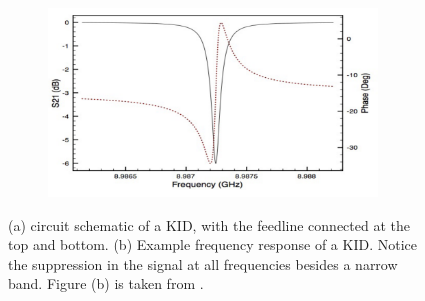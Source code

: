 \begin{figure}
	\centering
	\begin{subfigure}{0.4\textwidth}
		\caption{}
		\label{kid-circuit}
	\end{subfigure}
	\begin{subfigure}{0.4\textwidth}
		\includegraphics[width = \textwidth, height = 5cm]{images/freq-response.png}
		\caption{}
		\label{freq-response}
	\end{subfigure}
	\caption{(a) circuit schematic of a KID, with the feedline connected at the top and bottom. (b) Example
	frequency response of a KID. Notice the suppression in the signal at all frequencies besides a narrow
band. Figure (b) is taken from \cite{doyleLumpedElementKinetic2008}.} 
\end{figure}


